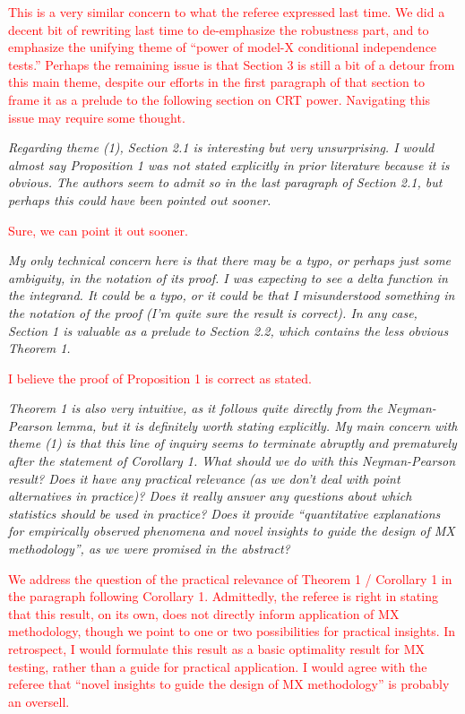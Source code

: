 \documentclass[12pt]{article}
\begin{document}
\textcolor{red}{This is a very similar concern to what the referee expressed last time. We did a decent bit of rewriting last time to de-emphasize the robustness part, and to emphasize the unifying theme of ``power of model-X conditional independence tests.'' Perhaps the remaining issue is that Section 3 is still a bit of a detour from this main theme, despite our efforts in the first paragraph of that section to frame it as a prelude to the following section on CRT power. Navigating this issue may require some thought.}

\textsl{Regarding theme (1), Section 2.1 is interesting but very unsurprising. I would almost say Proposition  1 was not stated explicitly in prior literature because it is obvious. The authors seem to admit so in the last paragraph of Section 2.1, but perhaps this could have been pointed out sooner.}

\textcolor{red}{Sure, we can point it out sooner.}

\textsl{My only technical concern here is that there may be a typo, or perhaps just some ambiguity, in the notation of its proof. I was expecting to see a delta function in the integrand. It could be a typo, or it could be that I misunderstood something in the notation of the proof (I’m quite sure the result is correct). In any case, Section 1 is valuable as a prelude to Section 2.2, which contains the less obvious Theorem 1.}

\textcolor{red}{I believe the proof of Proposition 1 is correct as stated.}

\textsl{Theorem 1 is also very intuitive, as it follows quite directly from the Neyman-Pearson lemma, but it is definitely worth stating explicitly. My main concern with theme (1) is that this line of inquiry seems to terminate abruptly and prematurely after the statement of Corollary 1. What should we do with this Neyman-Pearson result? Does it have any practical relevance (as we don’t deal with point alternatives in practice)? Does it really answer any questions about which statistics should be used in practice? Does it provide “quantitative explanations for empirically observed phenomena and novel insights to guide the design of MX methodology”, as we were promised in the abstract?} 

\textcolor{red}{We address the question of the practical relevance of Theorem 1 / Corollary 1 in the paragraph following Corollary 1. Admittedly, the referee is right in stating that this result, on its own, does not directly inform application of MX methodology, though we point to one or two possibilities for practical insights. In retrospect, I would formulate this result as a basic optimality result for MX testing, rather than a guide for practical application. I would agree with the referee that ``novel insights to guide the design of MX methodology'' is probably an oversell.}
\end{document}
